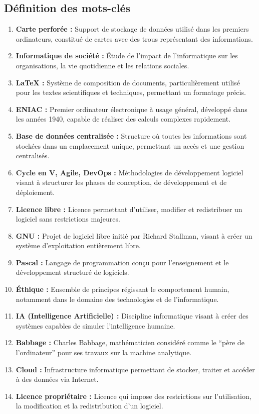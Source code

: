 \subsection{Définition des mots-clés}
\begin{enumerate}[nosep]
    \item \textbf{Carte perforée :} Support de stockage de données utilisé dans les premiers ordinateurs, constitué de cartes avec des trous représentant des informations.
    \item \textbf{Informatique de société :} Étude de l’impact de l’informatique sur les organisations, la vie quotidienne et les relations sociales.
    \item \textbf{\LaTeX{} :} Système de composition de documents, particulièrement utilisé pour les textes scientifiques et techniques, permettant un formatage précis.
    \item \textbf{ENIAC :} Premier ordinateur électronique à usage général, développé dans les années 1940, capable de réaliser des calculs complexes rapidement.
    \item \textbf{Base de données centralisée :} Structure où toutes les informations sont stockées dans un emplacement unique, permettant un accès et une gestion centralisés.
    \item \textbf{Cycle en V, Agile, DevOps :} Méthodologies de développement logiciel visant à structurer les phases de conception, de développement et de déploiement.
    \item \textbf{Licence libre :} Licence permettant d’utiliser, modifier et redistribuer un logiciel sans restrictions majeures.
    \item \textbf{GNU :} Projet de logiciel libre initié par Richard Stallman, visant à créer un système d’exploitation entièrement libre.
    \item \textbf{Pascal :} Langage de programmation conçu pour l’enseignement et le développement structuré de logiciels.
    \item \textbf{Éthique :} Ensemble de principes régissant le comportement humain, notamment dans le domaine des technologies et de l’informatique.
    \item \textbf{IA (Intelligence Artificielle) :} Discipline informatique visant à créer des systèmes capables de simuler l’intelligence humaine.
    \item \textbf{Babbage :} Charles Babbage, mathématicien considéré comme le “père de l’ordinateur” pour ses travaux sur la machine analytique.
    \item \textbf{Cloud :} Infrastructure informatique permettant de stocker, traiter et accéder à des données via Internet.
    \item \textbf{Licence propriétaire :} Licence qui impose des restrictions sur l’utilisation, la modification et la redistribution d’un logiciel.
\end{enumerate}

